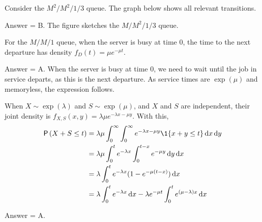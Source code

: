 \begin{exercise}[201804]
  Consider the $M^2/M^2/1/3$ queue.  The graph below shows all relevant transitions.

  \begin{center}
  \end{center}
\begin{solution}
Answer = B. The figure sketches the $M/M^2/1/3$ queue.
\end{solution}
\end{exercise}

\begin{exercise}[201804]
For the $M/M/1$ queue, when the server is busy at time $0$,  the  time to the next departure has density $f_D(t) = \mu e^{-\mu t}$.
\begin{solution}
Answer = A. When the server is busy at time $0$, we need to wait until the job in service departs, as this is the next departure. As service times are $\exp(\mu)$ and memoryless, the expression follows.
\end{solution}
\end{exercise}

\begin{exercise}[201804]
When $X\sim \exp(\lambda)$ and $S\sim\exp(\mu)$, and $X$ and $S$ are independent, their joint density is $f_{X,S}(x,y) = \lambda \mu e^{-\lambda x - \mu y}$. With this,
  \begin{align*}
\P{X+S\leq t } 
&= \lambda \mu \int_0^\infty \int_0^\infty e^{-\lambda x - \mu y} \1{x+y\leq t} \d x \d y \\
&= \lambda \mu \int_0^t e^{-\lambda x} \int_0^{t-x} e^{- \mu y} \d y \d x \\
&= \lambda \int_0^t e^{-\lambda x} (1-e^{- \mu (t-x)} ) \d x  \\
&= \lambda \int_0^t e^{-\lambda x}  \d x - \lambda e^{-\mu t} \int_0^t e^{(\mu-\lambda) x} \d x \\
  \end{align*}
\begin{solution}
Answer = A.
\end{solution}
\end{exercise}


